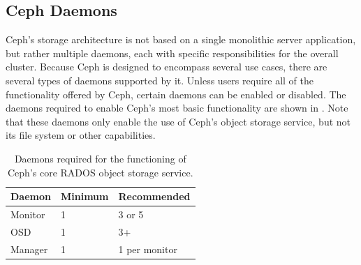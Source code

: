 


\subsection{Ceph Daemons}

Ceph's storage architecture is not based on a single monolithic server application, but rather multiple daemons, each with specific responsibilities for the overall cluster. Because Ceph is designed to encompass several use cases, there are several types of daemons supported by it. Unless users require all of the functionality offered by Ceph, certain daemons can be enabled or disabled. The daemons required to enable Ceph's most basic functionality are shown in . Note that these daemons only enable the use of Ceph's object storage service, but not its file system or other capabilities.

\begin{table}[htbp]
    \centering
    \begin{tabular}{|lll|}
        \hline
        \textbf{Daemon} & \textbf{Minimum} & \textbf{Recommended} \\
        \hline
        Monitor & 1       & 3 or 5        \\
        OSD     & 1       & 3+            \\
        Manager & 1       & 1 per monitor \\
        \hline
    \end{tabular}
    \caption[Required Ceph Daemons]{Daemons required for the functioning of Ceph's core \acs{RADOS} object storage service.}
    \label{tbl:ceph-required-daemons}
\end{table}

